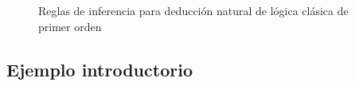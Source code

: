 \begin{figure}[H]
    \begin{multicols}{2}
        \proofTreeFalseE
        \proofTreeTrueI
    \end{multicols}
    
    \begin{multicols}{2}
        \proofTreeLEM
        \proofTreeAx
    \end{multicols}

    \proofSpacing

    \proofTreeAndI

    \begin{multicols}{2}
        \proofTreeAndEOne
        \proofTreeAndETwo
    \end{multicols}

    \proofSpacing

    \begin{multicols}{2}
        \proofTreeOrIOne
        \proofTreeOrITwo
    \end{multicols}
    
    \proofTreeOrE

    \proofSpacing

    \begin{multicols}{2}
        \proofTreeImpI
        \proofTreeImpE
    \end{multicols}
    \begin{multicols}{2}
        \proofTreeNotI
        \proofTreeNotE
    \end{multicols}

    \proofSpacing

    \begin{multicols}{2}
        \proofTreeForallI
        \proofTreeForallE
    \end{multicols}

    \proofSpacing

    \proofTreeExistsI
    \proofTreeExistsE

    \caption{Reglas de inferencia para deducción natural de lógica clásica de primer orden}
    \label{nd:inference-rules}
\end{figure}

\subsection{Ejemplo introductorio}

